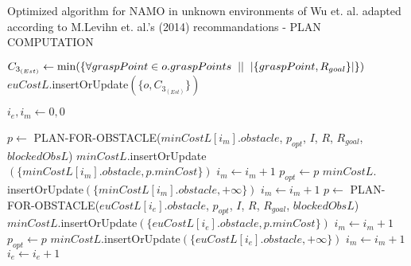 \begin{algorithm}[H]

  \caption{Optimized algorithm for NAMO in unknown environments of Wu et. al. adapted according to M.Levihn et. al.'s (2014) recommandations - PLAN COMPUTATION}

  \label{alg:02-levihn-makeplan}

  \begin{algorithmic}[1]


          \State $C_{3_{(Est)}} \gets \min(\{\forall graspPoint \in o.graspPoints \hspace{0.2cm} || \hspace{0.2cm} |\{graspPoint, R_{goal}\}|\})$
          \State $euCostL$.insertOrUpdate$(\{o, C_{3_{(Est)}}\})$
      \EndFor

      \State $i_{e}, i_{m} \gets 0 , 0$ 

       
         
          \State $p \gets$ PLAN-FOR-OBSTACLE($minCostL[i_{m}].obstacle$, $p_{opt}$, $I$, $R$, $R_{goal}$, $blockedObsL$)
            \State $minCostL.$insertOrUpdate$(\{minCostL[i_{m}].obstacle, p.minCost\})$
            \State $i_{m} \gets i_{m} + 1$
              \State $p_{opt} \gets p$
            \EndIf
          \Else
            \State $minCostL.$insertOrUpdate$(\{minCostL[i_{m}].obstacle, +\infty\})$
            \State $i_{m} \gets i_{m} + 1$
          \EndIf
        \Else
           
            \State $p \gets$ PLAN-FOR-OBSTACLE($euCostL[i_{e}].obstacle$, $p_{opt}$, $I$, $R$, $R_{goal}$, $blockedObsL$)
              \State $minCostL.$insertOrUpdate$(\{euCostL[i_{e}].obstacle, p.minCost\})$
              \State $i_{m} \gets i_{m} + 1$
                \State $p_{opt} \gets p$
              \EndIf
            \Else {}
              \State $minCostL.$insertOrUpdate$(\{euCostL[i_{e}].obstacle, +\infty\})$
              \State $i_{m} \gets i_{m} + 1$
            \EndIf
          \EndIf
          \State $i_{e} \gets i_{e} + 1$
        \EndIf
      \EndWhile
    \EndProcedure
  \end{algorithmic}
\end{algorithm}
